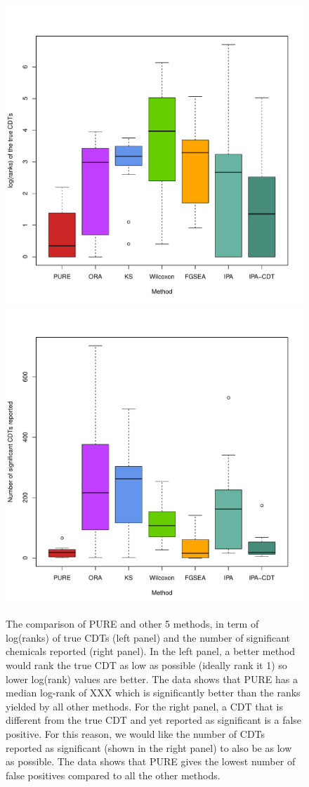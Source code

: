 \begin{figure}
\begin{center}
\includegraphics[width=0.49\linewidth]{../Figures/RankTarget_vOrg_log.pdf}
\includegraphics[width=0.49\linewidth]{../Figures/NrSigChem_vOrg.pdf}

\caption{The comparison of PURE and other 5 methods, in term of log(ranks) of true CDTs (left panel) and the number of significant chemicals reported (right panel). In the left panel, a better method would rank the true CDT as low as possible (ideally rank it 1) so lower log(rank) values are better. The data shows that PURE has a median log-rank of XXX which is significantly better than the ranks yielded by all other methods. For the right panel, a CDT that is different from the true CDT and yet reported as significant is a false positive. For this reason, we would like the number of CDTs reported as significant (shown in the right panel) to also be as low as possible. The data shows that PURE gives the lowest number  of false positives compared to all the other methods.}
\label{fig:resultFigure}
\end{center}
\end{figure}


